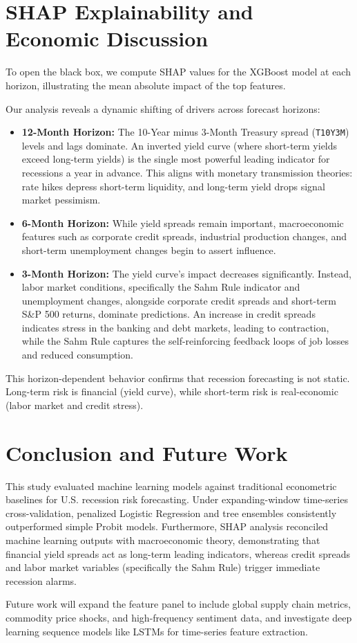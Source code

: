 \documentclass[11pt]{article}
\begin{document}
\section{SHAP Explainability and Economic Discussion}
To open the black box, we compute SHAP values for the XGBoost model at each horizon, illustrating the mean absolute impact of the top features.

Our analysis reveals a dynamic shifting of drivers across forecast horizons:
\begin{itemize}
    \item \textbf{12-Month Horizon:} The 10-Year minus 3-Month Treasury spread (\texttt{T10Y3M}) levels and lags dominate. An inverted yield curve (where short-term yields exceed long-term yields) is the single most powerful leading indicator for recessions a year in advance. This aligns with monetary transmission theories: rate hikes depress short-term liquidity, and long-term yield drops signal market pessimism.
    \item \textbf{6-Month Horizon:} While yield spreads remain important, macroeconomic features such as corporate credit spreads, industrial production changes, and short-term unemployment changes begin to assert influence.
    \item \textbf{3-Month Horizon:} The yield curve's impact decreases significantly. Instead, labor market conditions, specifically the Sahm Rule indicator and unemployment changes, alongside corporate credit spreads and short-term S&P 500 returns, dominate predictions. An increase in credit spreads indicates stress in the banking and debt markets, leading to contraction, while the Sahm Rule captures the self-reinforcing feedback loops of job losses and reduced consumption.
\end{itemize}

This horizon-dependent behavior confirms that recession forecasting is not static. Long-term risk is financial (yield curve), while short-term risk is real-economic (labor market and credit stress).

\section{Conclusion and Future Work}
This study evaluated machine learning models against traditional econometric baselines for U.S. recession risk forecasting. Under expanding-window time-series cross-validation, penalized Logistic Regression and tree ensembles consistently outperformed simple Probit models. Furthermore, SHAP analysis reconciled machine learning outputs with macroeconomic theory, demonstrating that financial yield spreads act as long-term leading indicators, whereas credit spreads and labor market variables (specifically the Sahm Rule) trigger immediate recession alarms. 

Future work will expand the feature panel to include global supply chain metrics, commodity price shocks, and high-frequency sentiment data, and investigate deep learning sequence models like LSTMs for time-series feature extraction.



\end{document}
